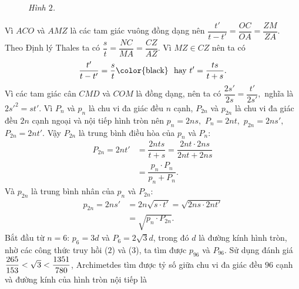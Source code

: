 \begin{multicols}{2}
\begin{figure}[H]
		\caption{\small\textit{\color{lichsutoanhoc}Hình $2$.}}
		\vspace*{-10pt}
	\end{figure}
	Vì $ACO$  và $AMZ$ là các tam giác vuông đồng dạng nên  $\dfrac{{t'}}{{t - t'}} = \dfrac{{OC}}{{OA}} = \dfrac{{ZM}}{{ZA}}.$
	\vskip 0.1cm
	Theo Định lý Thales ta có  $\dfrac{s}{t} = \dfrac{{NC}}{{MA}} = \dfrac{{CZ}}{{AZ}}.$
	\vskip 0.1cm
	Vì $MZ \in CZ$ nên ta có 
	\begin{align*}
		\dfrac{{t'}}{{t - t'}} = \dfrac{s}{t} \text{\color{black}\,\, hay } t' = \dfrac{{ts}}{{t + s}}.
	\end{align*}
	Vì các tam giác cân $CMD$  và  $COM$ là đồng dạng, nên ta có $\dfrac{{2s'}}{{2s}} = \dfrac{{t'}}{{2s'}},$  nghĩa là  $2{s'^2} = st'.$
	\vskip 0.1cm
	Vì $P_n$  và $p_n$  là chu vi đa giác đều $n$  cạnh, $P_{2n}$  và $p_{2n}$  là chu vi đa giác đều $2n$  cạnh ngoại và nội tiếp hình tròn nên ${p_n} = 2ns,$ ${P_n} = 2nt,$    ${p_{2n}} = 2ns',$   ${P_{2n}} = 2nt'.$
	\vskip 0.1cm
	Vậy $P_{2n}$   là trung bình điều hòa của  $p_n$ và $P_n$:
	\begin{align*}
		{P_{2n}} = 2nt' &= \dfrac{{2nts}}{{t + s}} = \dfrac{{2nt \cdot 2ns}}{{2nt + 2ns}} \\
		&= \dfrac{{{p_n} \cdot {P_n}}}{{{p_n} + {P_n}}}. \tag{$2$}
	\end{align*}
	Và $p_{2n}$ là trung bình nhân của $p_n$  và $P_{2n}$:  
	\begin{align*}
		{p_{2n}} = 2ns' &= 2n\sqrt {s \cdot t'}  = \sqrt {2ns \cdot 2nt'}  \\
		&= \sqrt {{p_n} \cdot {P_{2n}}} . \tag{$3$}
	\end{align*}
	Bắt đầu từ $n = 6$: $p_6 = 3d$ và $P_6 = 2\sqrt{3}d$,  trong đó $d$  là đường kính hình tròn, nhờ các công thức truy hồi ($2$) và ($3$), ta tìm được  $p_{96}$ và  $P_{96}$. Sử dụng đánh giá $\dfrac{{265}}{{153}}{\rm{ }} < \sqrt 3  < \dfrac{{1351}}{{780}}$,   Archimetdes tìm được tỷ số giữa chu vi đa giác đều $96$ cạnh và đường kính của hình tròn nội tiếp là 

\end{multicols}
